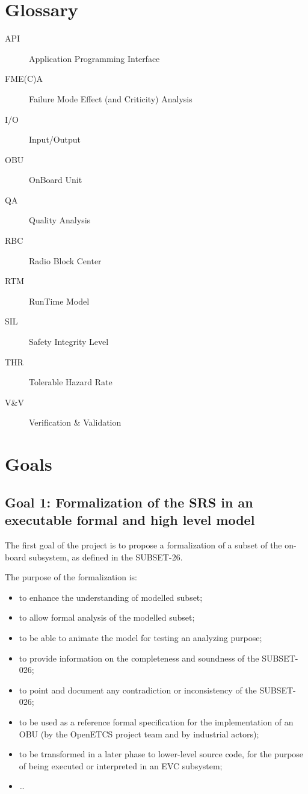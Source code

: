 \documentclass{template/openetcs_article}
\begin{document}
\section{Glossary}
\begin{description}
\item[API] Application Programming Interface
\item[FME(C)A] Failure Mode Effect (and Criticity) Analysis
\item[I/O] Input/Output
\item[OBU] OnBoard Unit
\item[QA] Quality Analysis
\item[RBC] Radio Block Center
\item[RTM] RunTime Model
\item[SIL] Safety Integrity Level
\item[THR] Tolerable Hazard Rate
\item[V\&V] Verification \& Validation
\end{description}

\section{Goals}
\subsection{Goal 1: Formalization of the SRS in an executable formal and high level model}
The first goal of the project is to propose a formalization of a subset of the on-board subsystem,
as defined in the SUBSET-26. 

The purpose of the formalization is:
\begin{itemize}
\item to enhance the understanding of modelled subset;
\item to allow formal analysis of the modelled subset;
\item to be able to animate the model for testing an analyzing purpose;
\item to provide information on the completeness and soundness of the SUBSET-026; 
\item to point and document any contradiction or inconsistency of the SUBSET-026; 
\item to be used as a reference formal specification for the implementation of an OBU 
(by the OpenETCS project team and by industrial actors);
\item to be transformed in a later phase to lower-level source code, for the purpose of 
being executed or interpreted in an EVC subsystem;
\item \dots
\end{itemize}
\end{document}
